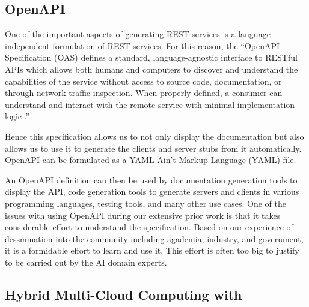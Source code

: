 \subsection{OpenAPI}

One of the important aspects of generating REST services is a
language-independent formulation of REST services. For this reason,
the ``OpenAPI Specification (OAS) defines a standard,
language-agnostic interface to RESTful APIs which allows both humans
and computers to discover and understand the capabilities of the
service without access to source code, documentation, or through
network traffic inspection. When properly defined, a consumer can
understand and interact with the remote service with minimal
implementation logic \cite{openapi}.''

Hence this specification allows us to not only display the
documentation but also allows us to use it to generate the clients and
server stubs from it automatically. OpenAPI can be formulated as a
YAML Ain't Markup Language (YAML) \cite{www-yaml} file.

An OpenAPI definition can then be used by documentation generation
tools to display the API, code generation tools to generate servers
and clients in various programming languages, testing tools, and many
other use cases. One of the issues with using OpenAPI during our extensive prior work
is that it takes considerable effort to understand
the specification. Based on our experience of dessmination into
the community including agademia, industry, and government, it is a
formidable effort to learn and use it. This effort is often too big
to justify to be carried out by the AI domain experts.


\subsection{Hybrid Multi-Cloud Computing with \Cloudmesh}\label{cloudmesh}

